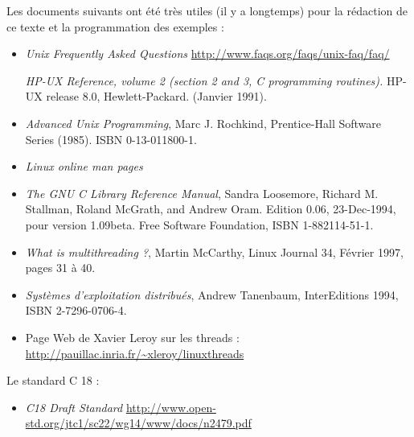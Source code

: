 
Les documents suivants ont été très utiles (il y a longtemps) pour la rédaction
de ce texte et la programmation des exemples :

\begin{itemize}
  
\item \emph{Unix Frequently Asked Questions}
  \url{http://www.faqs.org/faqs/unix-faq/faq/}


\emph{HP-UX Reference, volume 2 (section 2 and 3, C programming routines).}
HP-UX release 8.0, Hewlett-Packard. (Janvier 1991).

\item 
\emph{Advanced Unix Programming}, Marc J. Rochkind, Prentice-Hall Software Series
(1985).
ISBN 0-13-011800-1.

\item \emph{Linux online man pages} 

\item \emph{The GNU C Library Reference Manual}, Sandra Loosemore,
Richard M. Stallman, Roland McGrath, and Andrew Oram. Edition 0.06,
23-Dec-1994, pour version 1.09beta. Free Software Foundation,
ISBN 1-882114-51-1.

\item 
\emph{What is multithreading ?}, Martin McCarthy, Linux Journal 34, 
Février 1997, pages 31 à 40.

\item \emph{Systèmes d'exploitation distribués}, Andrew Tanenbaum,
InterEditions 1994, ISBN 2-7296-0706-4. 

\item  
Page Web de Xavier Leroy sur les threads :
\url{http://pauillac.inria.fr/~xleroy/linuxthreads}
\end{itemize}

Le standard C 18 :

\begin{itemize}
  \item \emph{C18 Draft Standard} \url{http://www.open-std.org/jtc1/sc22/wg14/www/docs/n2479.pdf}
\end{itemize}
